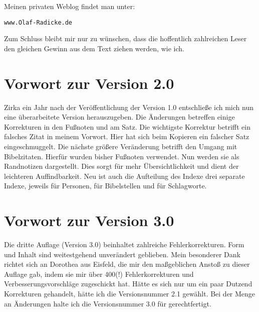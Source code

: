 Meinen privaten Weblog findet man unter:

\begin{center}
\texttt{www.Olaf-Radicke.de}
\end{center}

Zum Schluss bleibt mir nur zu wünschen, dass die hoffentlich zahlreichen Leser
den gleichen Gewinn aus dem Text ziehen werden, wie ich.


\chapter{Vorwort zur Version 2.0}

Zirka ein Jahr nach der Veröffentlichung der Version 1.0 entschließe ich mich 
nun eine überarbeitete Version herauszugeben. Die Änderungen betreffen einige
Korrekturen in den Fußnoten und am Satz. Die wichtigste Korrektur betrifft ein 
falsches Zitat in meinem Vorwort. Hier hat sich beim Kopieren ein falscher Satz 
eingeschmuggelt. Die nächste größere Veränderung betrifft den Umgang mit
Bibelzitaten. Hierfür wurden bisher Fußnoten verwendet. Nun werden sie als
Randnotizen dargestellt. Dies sorgt für mehr Übersichtlichkeit 
und dient der leichteren Auffindbarkeit. Neu ist auch die Aufteilung des Indexe 
drei separate Indexe, jeweils für Personen, für Bibelstellen und für Schlagworte.


\chapter{Vorwort zur Version 3.0}

Die dritte Auflage (Version 3.0) beinhaltet zahlreiche Fehlerkorrekturen.
Form und Inhalt sind weitestgehend unverändert geblieben. Mein besonderer Dank 
richtet sich an Dorothea aus Eisfeld, die mir den maßgeblichen Anstoß zu dieser 
Auflage gab, indem sie mir über 400(!) Fehlerkorrekturen und Verbesserungsvorschläge 
zugeschickt hat. Hätte es sich nur um ein paar Dutzend Korrekturen gehandelt,
hätte ich die Versionsnummer 2.1 gewählt. Bei der Menge an Änderungen halte
ich die Versionsnummer 3.0 für gerechtfertigt.

    
